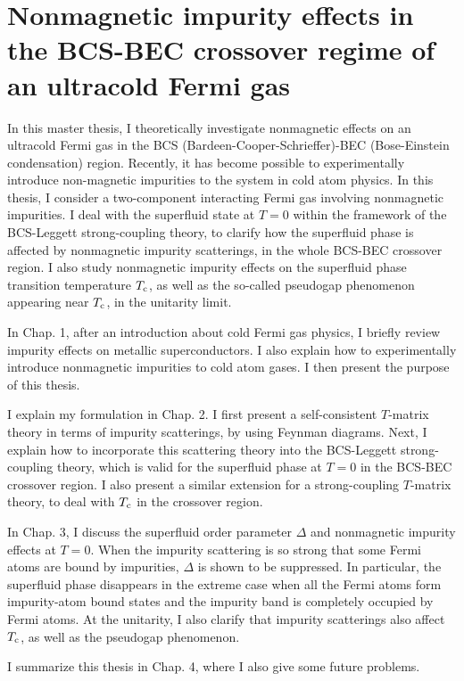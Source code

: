 \documentclass[12pt]{jsbook}
\begin{document}
\section*{Nonmagnetic impurity effects in the BCS-BEC crossover regime of an ultracold Fermi gas}
\par
In this master thesis, I theoretically investigate nonmagnetic effects on an ultracold Fermi gas in the BCS (Bardeen-Cooper-Schrieffer)-BEC (Bose-Einstein condensation) region. Recently, it has become possible to experimentally introduce non-magnetic impurities to the system in cold atom physics. In this thesis, I consider a two-component interacting Fermi gas involving nonmagnetic impurities. I deal with the superfluid state at $T=0$ within the framework of the BCS-Leggett strong-coupling theory, to clarify how the superfluid phase is affected by nonmagnetic impurity scatterings, in the whole BCS-BEC crossover region. I also study nonmagnetic impurity effects on the superfluid phase transition temperature $T_{\rm c}$, as well as the so-called pseudogap phenomenon appearing near $T_{\rm c}$, in the unitarity limit.
\par
In Chap. 1, after an introduction about cold Fermi gas physics, I briefly review impurity effects on metallic superconductors. I also explain how to experimentally introduce nonmagnetic impurities to cold atom gases. I then present the purpose of this thesis.
\par
I explain my formulation in Chap. 2. I first present a self-consistent $T$-matrix theory in terms of impurity scatterings, by using Feynman diagrams. Next, I explain how to incorporate this scattering theory into the BCS-Leggett strong-coupling theory, which is valid for the superfluid phase at $T=0$ in the BCS-BEC crossover region. I also present a similar extension for a strong-coupling $T$-matrix theory, to deal with $T_{\rm c}$ in the crossover region.
\par
In Chap. 3, I discuss the superfluid order parameter $\Delta$ and nonmagnetic impurity effects at $T=0$. When the impurity scattering is so strong that some Fermi atoms are bound by impurities, $\Delta$ is shown to be suppressed. In particular, the superfluid phase disappears in the extreme case when all the Fermi atoms form impurity-atom bound states and the impurity band is completely occupied by Fermi atoms. At the unitarity, I also clarify that impurity scatterings also affect $T_{\rm c}$, as well as the pseudogap phenomenon.
\par
I summarize this thesis in Chap. 4, where I also give some future problems.
\end{document}
